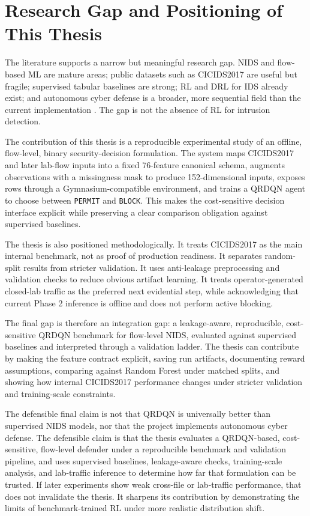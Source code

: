 \section{Research Gap and Positioning of This Thesis}

The literature supports a narrow but meaningful research gap. NIDS and flow-based ML are mature areas; public datasets such as CICIDS2017 are useful but fragile; supervised tabular baselines are strong; RL and DRL for IDS already exist; and autonomous cyber defense is a broader, more sequential field than the current implementation \parencite{Ring2019DatasetSurvey,LiuLang2019IDSSurvey,Yang2024DRLNIDSSurvey,Kheddar2025RLIDSReview}. The gap is not the absence of RL for intrusion detection.

The contribution of this thesis is a reproducible experimental study of an offline, flow-level, binary security-decision formulation. The system maps CICIDS2017 and later lab-flow inputs into a fixed 76-feature canonical schema, augments observations with a missingness mask to produce 152-dimensional inputs, exposes rows through a Gymnasium-compatible environment, and trains a QRDQN agent to choose between \texttt{PERMIT} and \texttt{BLOCK}. This makes the cost-sensitive decision interface explicit while preserving a clear comparison obligation against supervised baselines.

The thesis is also positioned methodologically. It treats CICIDS2017 as the main internal benchmark, not as proof of production readiness. It separates random-split results from stricter validation. It uses anti-leakage preprocessing and validation checks to reduce obvious artifact learning. It treats operator-generated closed-lab traffic as the preferred next evidential step, while acknowledging that current Phase 2 inference is offline and does not perform active blocking.

The final gap is therefore an integration gap: a leakage-aware, reproducible, cost-sensitive QRDQN benchmark for flow-level NIDS, evaluated against supervised baselines and interpreted through a validation ladder. The thesis can contribute by making the feature contract explicit, saving run artifacts, documenting reward assumptions, comparing against Random Forest under matched splits, and showing how internal CICIDS2017 performance changes under stricter validation and training-scale constraints.

The defensible final claim is not that QRDQN is universally better than supervised NIDS models, nor that the project implements autonomous cyber defense. The defensible claim is that the thesis evaluates a QRDQN-based, cost-sensitive, flow-level defender under a reproducible benchmark and validation pipeline, and uses supervised baselines, leakage-aware checks, training-scale analysis, and lab-traffic inference to determine how far that formulation can be trusted. If later experiments show weak cross-file or lab-traffic performance, that does not invalidate the thesis. It sharpens its contribution by demonstrating the limits of benchmark-trained RL under more realistic distribution shift.
